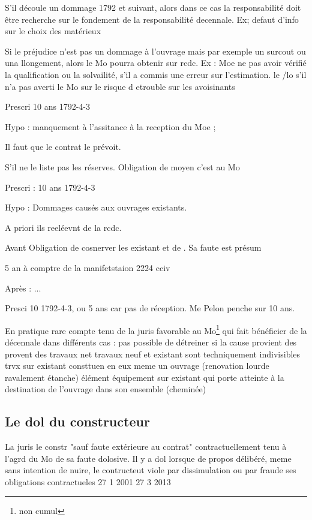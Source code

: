		S'il découle un dommage 1792 et suivant, alors dans ce cas la responsabilité doit être recherche sur le fondement de la responsabilité decennale. Ex; defaut d'info sur le choix des matérieux

		Si le préjudice n'est pas un dommage à l'ouvrage mais par exemple un surcout ou una llongement, alors le Mo pourra obtenir sur rcdc. Ex : Moe ne pas avoir vérifié la qualification ou la solvailité, s'il a commis une erreur sur l'estimation.
		le /lo s'il n'a pas averti le Mo sur le risque d etrouble sur les avoisinants

		Prescri 10 ans 1792-4-3

		Hypo : manquement à l'assitance à la reception du Moe ;

 		Il faut que le contrat le prévoit.

		S'il ne le liste pas les réserves. Obligation de moyen c'est au Mo

		Prescri : 10 ans 1792-4-3

		Hypo : Dommages causés aux ouvrages existants.

		A priori ils reeléevnt de la rcdc.

		Avant Obligation de cosnerver les existant et de . Sa faute est présum

		5 an à comptre de la manifetstaion 2224 cciv

		Après : ...

		Presci 10 1792-4-3, ou 5 ans car pas de réception. Me Pelon penche sur 10 ans.

		En pratique rare compte tenu de la juris favorable au Mo\footnote{non cumul} qui fait bénéficier de la décennale dans différents cas :
		 pas possible de détreiner si la cause provient des
		 provent des travaux net travaux neuf et existant sont techniquement indivisibles
		 trvx sur existant consttuen en eux meme un ouvrage (renovation lourde ravalement étanche)
		 élément équipement sur existant qui porte atteinte à la destination de l'ouvrage dans son ensemble (cheminée)

	\subsection{Le dol du constructeur}

		La juris le constr "sauf faute extérieure au contrat" contractuellement  tenu à l'agrd du Mo de sa faute dolosive. Il y a dol lorsque de propos délibéré, meme sans intention de nuire, le contructeut viole par dissimulation ou par fraude ses obligations contractueles 27 1 2001 27 3 2013

